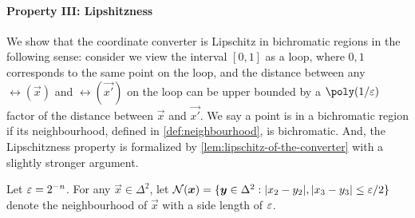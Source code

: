 \paragraph{Property III: Lipshitzness}  
We show that the coordinate converter is Lipschitz in bichromatic regions in the following sense: consider we view the interval $[0,1]$ as a loop, where $0,1$ corresponds to the same point on the loop, and the distance between any $\rel(\vec{x})$ and $\rel(\vec{x'})$ on the loop can be upper bounded by a $\poly(1/\eps)$ factor of the distance between $\vec{x}$ and $\vec{x'}$. 
We say a point is in a bichromatic region if its neighbourhood, defined in \cref{def:neighbourhood}, is bichromatic.
And, the Lipschitzness property is formalized by \cref{lem:lipschitz-of-the-converter} with a slightly stronger argument.

\begin{definition}
    \label{def:neighbourhood}
    Let $\varepsilon=2^{-n}$.
    For any $\vec{x} \in \Delta^{2}$, let $\mathcal{N}(\boldsymbol{x})=\{{\boldsymbol{y}\in \Delta^2: |x_2-y_2|, |x_3-y_3|\leq \varepsilon/2} \}$ denote the neighbourhood of $\vec{x}$ with a side length of $\varepsilon$. 
\end{definition}

